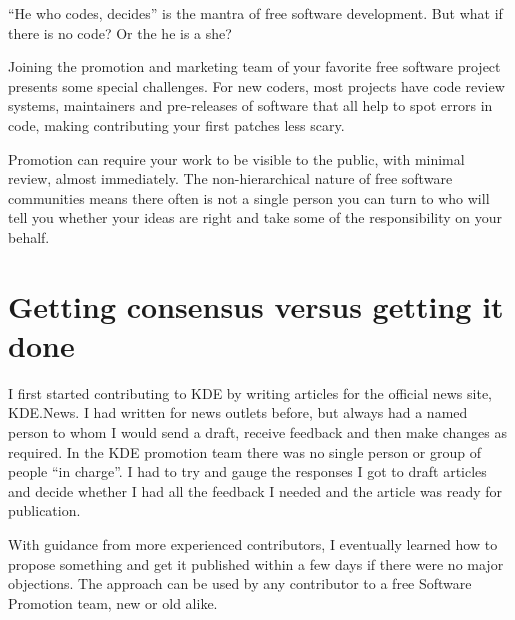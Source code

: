 

\noindent{}``He who codes, decides'' is the mantra of free software development.
But what if there is no code? Or the he is a she?

Joining the promotion and marketing team of your favorite free software project
presents some special challenges. For new coders, most projects have code review
systems, maintainers and pre-releases of software that all help to spot errors
in code, making contributing your first patches less scary. 

Promotion can require your work to be visible to the public, with minimal
review, almost immediately. The non-hierarchical nature of free software
communities means there often is not a single person you can turn to who will
tell you whether your ideas are right and take some of the responsibility on
your behalf.

\section*{Getting consensus versus getting it done}

I first started contributing to KDE by writing articles for the official news
site, KDE.News. I had written for news outlets before, but always had a named
person to whom I would send a draft, receive feedback and then make changes as
required. In the KDE promotion team there was no single person or group of
people ``in charge''. I had to try and gauge the responses I got to draft
articles and decide whether I had all the feedback I needed and the article was
ready for publication.

With guidance from more experienced contributors, I eventually learned how to
propose something and get it published within a few days if there were no major
objections. The approach can be used by any contributor to a free Software
Promotion team, new or old alike.

